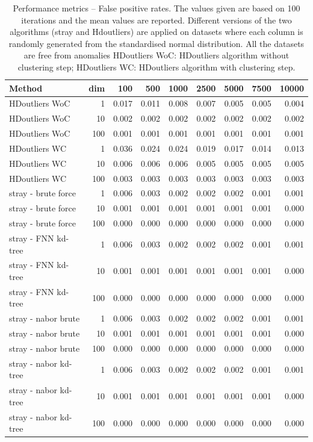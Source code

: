\documentclass[11pt,a4paper,]{article}
\theoremstyle{definition}
\theoremstyle{definition}
\theoremstyle{definition}
\theoremstyle{remark}
\begin{document}
\begin{table}[t]

\caption{\label{tab:performEvalFP}Performance metrics -- False positive rates. 
        The values given are based on 100 iterations and the mean values 
        are reported. Different versions of the two algorithms
        (stray and Hdoutliers) are applied on datasets where each column
        is randomly generated from the standardised normal distribution.
        All the datasets are free from anomalies
        HDoutliers WoC: HDoutliers algorithm without clustering step;
        HDoutliers WC: HDoutliers algorithm with clustering step.}
\centering
\begin{tabular}{lrrrrrrrr}
\toprule
Method & dim & 100 & 500 & 1000 & 2500 & 5000 & 7500 & 10000\\
\midrule
HDoutliers WoC & 1 & 0.017 & 0.011 & 0.008 & 0.007 & 0.005 & 0.005 & 0.004\\
HDoutliers WoC & 10 & 0.002 & 0.002 & 0.002 & 0.002 & 0.002 & 0.002 & 0.002\\
HDoutliers WoC & 100 & 0.001 & 0.001 & 0.001 & 0.001 & 0.001 & 0.001 & 0.001\\
HDoutliers WC & 1 & 0.036 & 0.024 & 0.024 & 0.019 & 0.017 & 0.014 & 0.013\\
HDoutliers WC & 10 & 0.006 & 0.006 & 0.006 & 0.005 & 0.005 & 0.005 & 0.005\\
\addlinespace
HDoutliers WC & 100 & 0.003 & 0.003 & 0.003 & 0.003 & 0.003 & 0.003 & 0.003\\
stray - brute force & 1 & 0.006 & 0.003 & 0.002 & 0.002 & 0.002 & 0.001 & 0.001\\
stray - brute force & 10 & 0.001 & 0.001 & 0.001 & 0.001 & 0.001 & 0.001 & 0.000\\
stray - brute force & 100 & 0.000 & 0.000 & 0.000 & 0.000 & 0.000 & 0.000 & 0.000\\
stray - FNN kd-tree & 1 & 0.006 & 0.003 & 0.002 & 0.002 & 0.002 & 0.001 & 0.001\\
\addlinespace
stray - FNN kd-tree & 10 & 0.001 & 0.001 & 0.001 & 0.001 & 0.001 & 0.001 & 0.000\\
stray - FNN kd-tree & 100 & 0.000 & 0.000 & 0.000 & 0.000 & 0.000 & 0.000 & 0.000\\
stray - nabor brute & 1 & 0.006 & 0.003 & 0.002 & 0.002 & 0.002 & 0.001 & 0.001\\
stray - nabor brute & 10 & 0.001 & 0.001 & 0.001 & 0.001 & 0.001 & 0.001 & 0.000\\
stray - nabor brute & 100 & 0.000 & 0.000 & 0.000 & 0.000 & 0.000 & 0.000 & 0.000\\
\addlinespace
stray - nabor kd-tree & 1 & 0.006 & 0.003 & 0.002 & 0.002 & 0.002 & 0.001 & 0.001\\
stray - nabor kd-tree & 10 & 0.001 & 0.001 & 0.001 & 0.001 & 0.001 & 0.001 & 0.000\\
stray - nabor kd-tree & 100 & 0.000 & 0.000 & 0.000 & 0.000 & 0.000 & 0.000 & 0.000\\
\bottomrule
\end{tabular}
\end{table}
\end{document}
